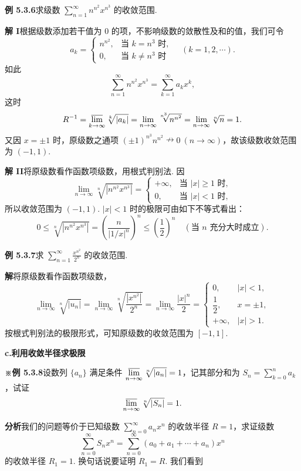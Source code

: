 \documentclass[UTF8, 12pt, fontset=fandol, oneside]{ctexart}
\begin{document}
\noindent\textbf{例 5.3.6}\quad 求级数 $\displaystyle\sum_{n=1}^{\infty}n^{n^2}x^{n^3}$ 的收敛范围.

\noindent\textbf{解 I}\quad 根据级数添加若干值为 0 的项，不影响级数的敛散性及和的值，我们可令
\[
  a_k=
  \begin{cases}
    n^{n^2},&\text{当 }k=n^3\text{ 时},\\
    0,&\text{当 }k\ne n^3\text{ 时}
  \end{cases}
  \quad(k=1,2,\cdots).
\]
如此
\[
  \sum_{n=1}^{\infty}n^{n^2}x^{n^3}
  =\sum_{k=1}^{\infty}a_kx^k,
\]
这时
\[
  R^{-1}=\varlimsup_{k\to\infty}\sqrt[k]{|a_k|}
  =\lim_{n\to\infty}\sqrt[n^3]{n^{n^2}}
  =\lim_{n\to\infty}\sqrt[n]{n}=1.
\]
又因 $x=\pm1$ 时，原级数之通项 $(\pm1)^{n^3}n^{n^2}\nrightarrow0\ (n\to\infty)$，故该级数收敛范围为
$(-1,1)$.

\noindent\textbf{解 II}\quad 将原级数看作函数项级数，用根式判别法. 因
\[
  \lim_{n\to\infty}\sqrt[n]{|n^{n^2}x^{n^3}|}=
  \begin{cases}
    +\infty,&\text{当 }|x|\ge1\text{ 时},\\
    0,&\text{当 }|x|<1\text{ 时},
  \end{cases}
\]
所以收敛范围为 $(-1,1)$. $|x|<1$ 时的极限可由如下不等式看出：
\[
  0\le\sqrt[n]{|n^{n^2}x^{n^3}|}
  =\left(\frac{n}{|1/x|^n}\right)^n
  \le\left(\frac12\right)^n\quad(\text{当 }n\text{ 充分大时成立}).
\]

\noindent\textbf{例 5.3.7}\quad 求 $\displaystyle\sum_{n=1}^{\infty}\frac{x^{n^2}}{2^n}$ 的收敛范围.

\noindent\textbf{解}\quad 将原级数看作函数项级数，
\[
  \lim_{n\to\infty}\sqrt[n]{|u_n|}
  =\lim_{n\to\infty}\sqrt[n]{\frac{|x^{n^2}|}{2^n}}
  =\lim_{n\to\infty}\frac{|x|^n}{2}
  =
  \begin{cases}
    0,&|x|<1,\\
    \dfrac12,&x=\pm1,\\
    +\infty,&|x|>1.
  \end{cases}
\]
按根式判别法的极限形式，可知原级数的收敛范围为 $[-1,1]$.

\noindent\textbf{c.\quad 利用收敛半径求极限}

\noindent\textbf{※例 5.3.8}\quad 设数列 $\{a_n\}$ 满足条件
$\displaystyle\varlimsup_{n\to\infty}\sqrt[n]{|a_n|}=1$，记其部分和为
$S_n=\displaystyle\sum_{k=0}^n a_k$，试证
\[
  \varlimsup_{n\to\infty}\sqrt[n]{|S_n|}=1.
\]

\noindent\textbf{分析}\quad 我们的问题等价于已知级数 $\displaystyle\sum_{n=0}^{\infty}a_nx^n$ 的收敛半径
$R=1$，求证级数
\[
  \sum_{n=0}^{\infty}S_nx^n
  =\sum_{n=0}^{\infty}(a_0+a_1+\cdots+a_n)x^n
\]
的收敛半径 $R_1=1$. 换句话说要证明 $R_1=R$. 我们看到
\end{document}
